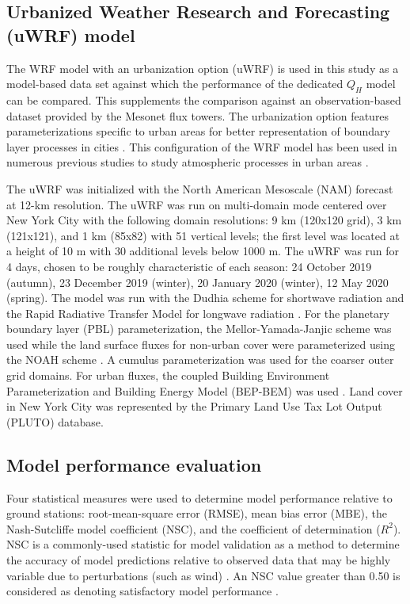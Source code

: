 \subsection{Urbanized Weather Research and Forecasting (uWRF) model} \label{methodology-uwrf}
The WRF model \citep{Skamarock_2008} with an urbanization option (uWRF) is used in this study as a model-based data set against which the performance of the dedicated $Q_H$ model can be compared.  This supplements the comparison against an observation-based dataset provided by the Mesonet flux towers. The urbanization option features parameterizations specific to urban areas for better representation of boundary layer processes in cities \citep{Gutierrez_20152, Gutierrez_20153}. This configuration of the WRF model has been used in numerous previous studies to study atmospheric processes in urban areas \citep{Chen_2011, Gamarro_2019, Gutierrez_20151, Hrisko_2021, Ortiz_2017}.

The uWRF was initialized with the North American Mesoscale (NAM) forecast at 12-km resolution. The uWRF was run on multi-domain mode centered over New York City with the following domain resolutions: 9 km (120x120 grid), 3 km (121x121), and 1 km (85x82) with 51 vertical levels; the first level was located at a height of 10 m with 30 additional levels below 1000 m. The uWRF was run for 4 days, chosen to be roughly characteristic of each season: 24 October 2019 (autumn), 23 December 2019 (winter), 20 January 2020 (winter), 12 May 2020 (spring). The model was run with the Dudhia scheme \citep{Dudhia_1989} for shortwave radiation and the Rapid Radiative Transfer Model for longwave radiation \citep{Mlawer_1997}. For the planetary boundary layer (PBL) parameterization, the Mellor-Yamada-Janjic scheme \citep{Janjic_1994} was used while the land surface fluxes for non-urban cover were parameterized using the NOAH scheme \citep{Niu_2011}. A cumulus parameterization was used for the coarser outer grid domains. For urban fluxes, the coupled Building Environment Parameterization and Building Energy Model (BEP-BEM) was used \citep{Salamanca_2010}. Land cover in New York City was represented by the Primary Land Use Tax Lot Output (PLUTO) database. 

\subsection{Model performance evaluation}
Four statistical measures were used to determine model performance relative to ground stations: root-mean-square error (RMSE), mean bias error (MBE), the Nash-Sutcliffe model coefficient (NSC), and the coefficient of determination ($R^2$).  NSC is a commonly-used statistic for model validation as a method to determine the accuracy of model predictions relative to observed data that may be highly variable due to perturbations (such as wind) \citep{Legates_1999, Nash_1970}. An NSC value greater than 0.50 is considered as denoting satisfactory model performance \citep{Moriasi_2007}. 

